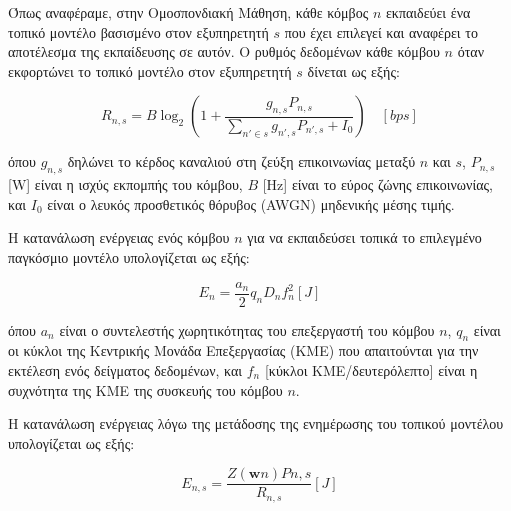\noindent
Όπως αναφέραμε, στην Ομοσπονδιακή Μάθηση, κάθε κόμβος $n$ εκπαιδεύει ένα τοπικό μοντέλο βασισμένο στον εξυπηρετητή $s$ που έχει επιλεγεί και αναφέρει το αποτέλεσμα της εκπαίδευσης σε αυτόν. Ο ρυθμός δεδομένων κάθε κόμβου $n$ όταν εκφορτώνει το τοπικό μοντέλο στον εξυπηρετητή $s$ δίνεται ως εξής:

\vspace{-5pt}

\begin{equation}
R_{n,s} = B \log_2(1 + \frac{g_{n,s} P_{n,s}}{\sum \limits_{n'\in s} g_{n',s}P_{n',s} + I_0}) \quad [bps]
\label{eq3}
\end{equation}

\vspace{-3pt}

\noindent
όπου $g_{n,s}$ δηλώνει το κέρδος καναλιού στη ζεύξη επικοινωνίας μεταξύ $n$ και $s$, $P_{n,s}$ [W] είναι η ισχύς εκπομπής του κόμβου, $B$ [Hz] είναι το εύρος ζώνης επικοινωνίας, και $I_0$ είναι ο λευκός προσθετικός θόρυβος (AWGN) μηδενικής μέσης τιμής. 

Η κατανάλωση ενέργειας ενός κόμβου $n$ για να εκπαιδεύσει τοπικά το επιλεγμένο παγκόσμιο μοντέλο υπολογίζεται ως εξής:

\vspace{-5pt}

\begin{equation}
E_n=\frac{a_n}{2}q_nD_nf_n^2 [J]
\label{eq4}
\end{equation}

\vspace{-3pt}

\noindent
όπου $a_n$ είναι ο συντελεστής χωρητικότητας του επεξεργαστή του κόμβου $n$, $q_n$ είναι οι κύκλοι της Κεντρικής Μονάδα Επεξεργασίας (ΚΜΕ) που απαιτούνται για την εκτέλεση ενός δείγματος δεδομένων, και $f_n$ [κύκλοι ΚΜΕ/δευτερόλεπτο] είναι η συχνότητα της ΚΜΕ της συσκευής του κόμβου $n$.  

Η κατανάλωση ενέργειας λόγω της μετάδοσης της ενημέρωσης του τοπικού μοντέλου υπολογίζεται ως εξής:

\vspace{-5pt}

\begin{equation}
E_{n,s}=\frac{Z(\mathbf{w}n)P{n,s}}{R_{n,s}}[J]
\label{eq5}
\end{equation}

\vspace{-3pt}

